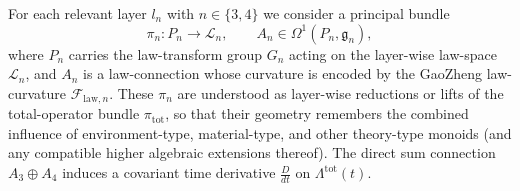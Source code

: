 \documentclass[11pt]{book}
\theoremstyle{plain}
\theoremstyle{definition}
\theoremstyle{remark}
\begin{document}
For each relevant layer $l_n$ with $n\in\{3,4\}$ we consider a
principal bundle
\begin{equation}
  \pi_n : P_n \to \mathcal{L}_n,
  \qquad
  A_n \in \Omega^1(P_n,\mathfrak{g}_n),
\end{equation}
where $P_n$ carries the law-transform group $G_n$ acting on the
layer-wise law-space $\mathcal{L}_n$, and $A_n$ is a law-connection
whose curvature is encoded by the GaoZheng law-curvature $\mathcal{F}_{\mathrm{law},n}$.
These $\pi_n$ are understood as layer-wise reductions or lifts of the
total-operator bundle $\pi_{\mathrm{tot}}$, so that their geometry
remembers the combined influence of environment-type, material-type, and
other theory-type monoids (and any compatible higher algebraic
extensions thereof). The direct sum connection $A_3 \oplus A_4$ induces
 a covariant time derivative $\frac{D}{dt}$ on $\Lambda^{\mathrm{tot}}(t)$.
\end{document}

